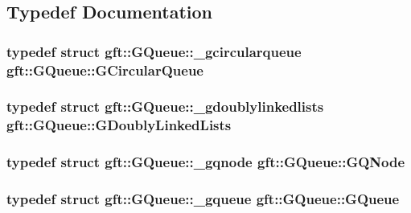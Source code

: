 \subsection{Typedef Documentation}
\hypertarget{namespacegft_1_1GQueue_a4e50e86d194a07f26216a096b1f5a067}{
\subsubsection[{G\-Circular\-Queue}]{\setlength{\rightskip}{0pt plus 5cm}typedef struct {\bf gft\-::\-G\-Queue\-::\-\_\-gcircularqueue}  {\bf gft\-::\-G\-Queue\-::\-G\-Circular\-Queue}}}\label{namespacegft_1_1GQueue_a4e50e86d194a07f26216a096b1f5a067}
\hypertarget{namespacegft_1_1GQueue_a0e26f1e55446a32e3d979146492805e3}{
\subsubsection[{G\-Doubly\-Linked\-Lists}]{\setlength{\rightskip}{0pt plus 5cm}typedef struct {\bf gft\-::\-G\-Queue\-::\-\_\-gdoublylinkedlists}  {\bf gft\-::\-G\-Queue\-::\-G\-Doubly\-Linked\-Lists}}}\label{namespacegft_1_1GQueue_a0e26f1e55446a32e3d979146492805e3}
\hypertarget{namespacegft_1_1GQueue_ac7674cc67b8bc9f99e7be02c493f473e}{
\subsubsection[{G\-Q\-Node}]{\setlength{\rightskip}{0pt plus 5cm}typedef struct {\bf gft\-::\-G\-Queue\-::\-\_\-gqnode}  {\bf gft\-::\-G\-Queue\-::\-G\-Q\-Node}}}\label{namespacegft_1_1GQueue_ac7674cc67b8bc9f99e7be02c493f473e}
\hypertarget{namespacegft_1_1GQueue_a3ed1b095d0e60d83f93c6e9a64a6058d}{
\subsubsection[{G\-Queue}]{\setlength{\rightskip}{0pt plus 5cm}typedef struct {\bf gft\-::\-G\-Queue\-::\-\_\-gqueue}  {\bf gft\-::\-G\-Queue\-::\-G\-Queue}}}\label{namespacegft_1_1GQueue_a3ed1b095d0e60d83f93c6e9a64a6058d}


